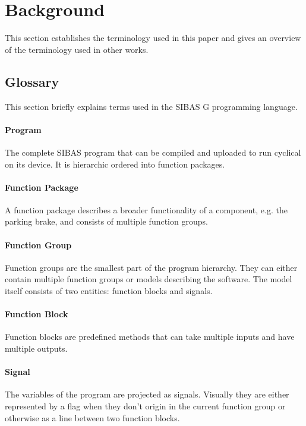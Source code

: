 \section{Background}\label{sec:vuln_background}

This section establishes the terminology used in this paper and gives an
overview of the terminology used in other works.

\subsection{Glossary}

This section briefly explains terms used in the SIBAS G programming language.

\paragraph{Program} The complete SIBAS program that can be compiled and uploaded to run cyclical on its device. It is hierarchic ordered into function packages.

\paragraph{Function Package} A function package describes a broader functionality of a component, e.g. the parking brake, and consists of multiple function groups.

\paragraph{Function Group} Function groups are the smallest part of the program hierarchy. They can either contain multiple function groups or models describing the software. The model itself consists of two entities: function blocks and signals.

\paragraph{Function Block} Function blocks are predefined methods that can take multiple inputs and have multiple outputs.

\paragraph{Signal} The variables of the program are projected as signals. Visually they are either represented by a flag when they don't origin in the current function group or otherwise as a line between two function blocks.

